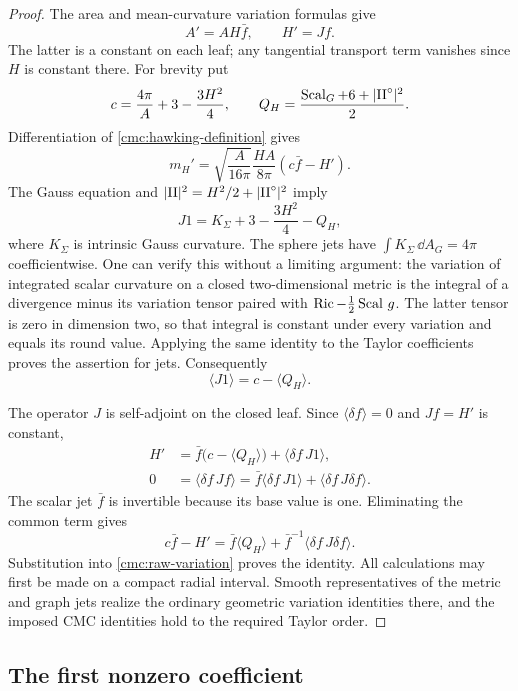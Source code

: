 \begin{proof}
The area and mean-curvature variation formulas give
\[
 A'=AH\bar f,\qquad H'=Jf.
\]
The latter is a constant on each leaf; any tangential transport
term vanishes since \(H\) is constant there.
For brevity put
\[
 c=\frac{4\pi}{A}+3-\frac{3H^2}{4},
 \qquad
 Q_H=\frac{\operatorname{Scal}_G+6+|\mathrm{II}^\circ|^2}{2}.
\]
Differentiation of \eqref{cmc:hawking-definition} gives
\begin{equation}\label{cmc:raw-variation}
 m_H'=\sqrt{\frac A{16\pi}}\frac{HA}{8\pi}
          (c\bar f-H').
\end{equation}
The Gauss equation and
\(|\mathrm{II}|^2=H^2/2+|\mathrm{II}^\circ|^2\) imply
\[
 J1=K_\Sigma+3-\frac{3H^2}{4}-Q_H,
\]
where \(K_\Sigma\) is intrinsic Gauss curvature.
The sphere jets have \(\int K_\Sigma\,\dd A_G=4\pi\)
coefficientwise.
One can verify this without a limiting argument: the variation of
integrated scalar curvature on a closed two-dimensional metric is
the integral of a divergence minus its variation tensor paired with
\(\operatorname{Ric}-\frac12\operatorname{Scal}\,g\).  The latter tensor is zero in dimension
two, so that integral is constant under every variation and equals
its round value.  Applying the same identity to the Taylor
coefficients proves the assertion for jets.
Consequently
\[
 \langle J1\rangle=c-\langle Q_H\rangle.
\]

The operator \(J\) is self-adjoint on the closed leaf.
Since \(\langle\delta f\rangle=0\) and \(Jf=H'\) is constant,
\begin{align*}
 H'&=\bar f\bigl(c-\langle Q_H\rangle\bigr)
                  +\langle\delta f\,J1\rangle,\\
 0&=\langle\delta f\,Jf\rangle
   =\bar f\langle\delta f\,J1\rangle
                  +\langle\delta f\,J\delta f\rangle.
\end{align*}
The scalar jet \(\bar f\) is invertible because its base value is one.
Eliminating the common term gives
\[
 c\bar f-H'
 =\bar f\langle Q_H\rangle
       +\bar f^{-1}\langle\delta f\,J\delta f\rangle.
\]
Substitution into \eqref{cmc:raw-variation} proves the identity.
All calculations may first be made on a compact radial interval.
Smooth representatives of the metric and graph jets realize the
ordinary geometric variation identities there, and the imposed CMC
identities hold to the required Taylor order.
\end{proof}

\subsection{The first nonzero coefficient}

